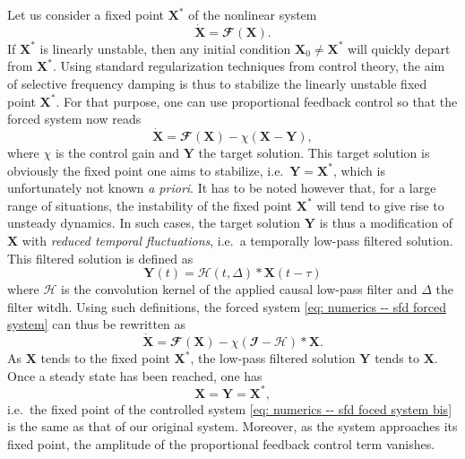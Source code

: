     Let us consider a fixed point $\mathbf{X}^*$ of the nonlinear system
    $$\dot{\mathbf{X}} = \mathbfcal{F} \left( \mathbf{X} \right).$$
    If $\mathbf{X}^*$ is linearly unstable, then any initial condition $\mathbf{X}_0 \neq \mathbf{X}^*$ will quickly depart from $\mathbf{X}^*$. Using standard regularization techniques from control theory, the aim of selective frequency damping is thus to stabilize the linearly unstable fixed point $\mathbf{X}^*$. For that purpose, one can use proportional feedback control so that the forced system now reads
    \begin{equation}
      \dot{\mathbf{X}} = \mathbfcal{F} \left( \mathbf{X} \right) - \chi \left( \mathbf{X} - \mathbf{Y} \right),
      \label{eq: numerics -- sfd forced system}
    \end{equation}
    where $\chi$ is the control gain and $\mathbf{Y}$ the target solution. This target solution is obviously the fixed point one aims to stabilize, i.e.\ $\mathbf{Y} = \mathbf{X}^*$, which is unfortunately not known \emph{a priori}. It has to be noted however that, for a large range of situations, the instability of the fixed point $\mathbf{X}^*$ will tend to give rise to unsteady dynamics. In such cases, the target solution $\mathbf{Y}$ is thus a modification of $\mathbf{X}$ with \emph{reduced temporal fluctuations}, i.e.\ a temporally low-pass filtered solution. This filtered solution is defined as
    \begin{equation}
      \mathbf{Y}(t) = \mathcal{H}(t, \Delta) * \mathbf{X}(t-\tau)
      \label{eq: numerics -- low-pass filtered solution}
    \end{equation}
    where $\mathcal{H}$ is the convolution kernel of the applied causal low-pass filter and $\Delta$ the filter witdh. Using such definitions, the forced system \eqref{eq: numerics -- sfd forced system} can thus be rewritten as
    \begin{equation}
      \dot{\mathbf{X}} = \mathbfcal{F}\left( \mathbf{X} \right) - \chi \left( \mathbfcal{I} - \mathcal{H} \right) * \mathbf{X}.
      \label{eq: numerics -- sfd foced system bis}
    \end{equation}
    As $\mathbf{X}$ tends to the fixed point $\mathbf{X}^*$, the low-pass filtered solution $\mathbf{Y}$ tends to $\mathbf{X}$. Once a steady state has been reached, one has
    $$\mathbf{X} = \mathbf{Y} = \mathbf{X}^*,$$
    i.e.\ the fixed point of the controlled system \eqref{eq: numerics -- sfd foced system bis} is the same as that of our original system. Moreover, as the system approaches its fixed point, the amplitude of the proportional feedback control term vanishes.

